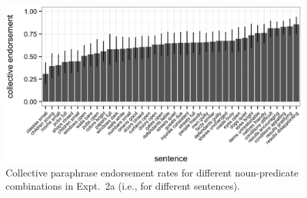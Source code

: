 \documentclass[preprint,12pt,authoryear,titlepage]{elsarticle}
\begin{document}
\begin{figure}[h!]
	\centering
	\includegraphics[width=1.04\linewidth]{plots/sentence_plot2.eps}
	\vspace{-20pt}
	\caption{Collective paraphrase endorsement rates for different noun-predicate combinations in Expt.~2a (i.e., for different sentences).} \label{sentence-coll}
\end{figure}
\end{document}
